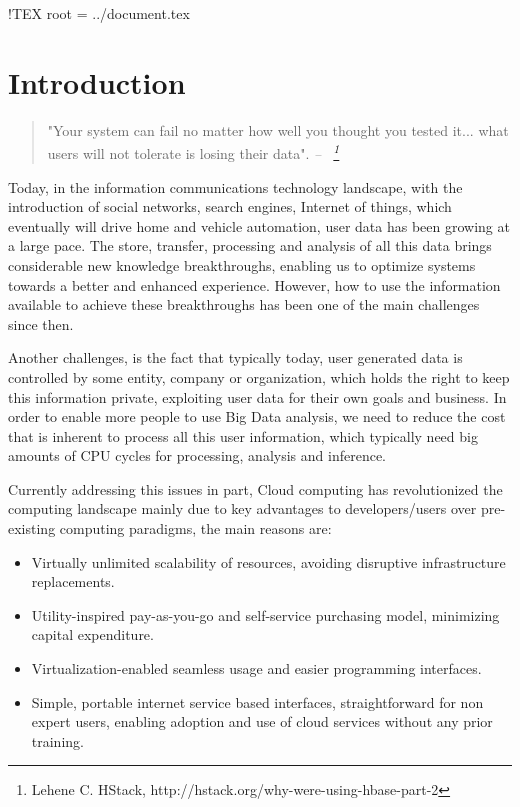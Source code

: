 !TEX root = ../document.tex
\chapter{Introduction}\label{ch:intro}

\begin{quotation}
"Your system can fail no matter how well you thought you tested it... what users will not tolerate is losing their data".
{\small\it -- ~\footnote{Lehene C. HStack, http://hstack.org/why-were-using-hbase-part-2} }
\end{quotation}

Today, in the information communications technology landscape, with the introduction of social networks, search engines, Internet of things, which eventually will drive home and vehicle automation, user data has been growing at a large pace. The store, transfer, processing and analysis of all this data brings considerable new knowledge breakthroughs, enabling us to optimize systems towards a better and enhanced experience. However, how to use the information available to achieve these breakthroughs has been one of the main challenges since then. 

Another challenges, is the fact that typically today, user generated data is controlled by some entity, company or organization, which holds the right to keep this information private, exploiting user data for their own goals and business. In order to enable more people to use Big Data analysis, we need to reduce the cost that is inherent to process all this user information, which typically need big amounts of CPU cycles for processing, analysis and inference.

Currently addressing this issues in part, Cloud computing has revolutionized the computing landscape mainly due to key advantages to developers/users over pre-existing computing paradigms, the main reasons are:
\begin{itemize}
  \item Virtually unlimited scalability of resources, avoiding disruptive infrastructure replacements.
  \item Utility-inspired pay-as-you-go and self-service purchasing model, minimizing capital expenditure.
  \item Virtualization-enabled seamless usage and easier programming interfaces.
  \item Simple, portable internet service based interfaces, straightforward for non expert users, enabling adoption and use of cloud services without any prior training.
 \end{itemize} 

